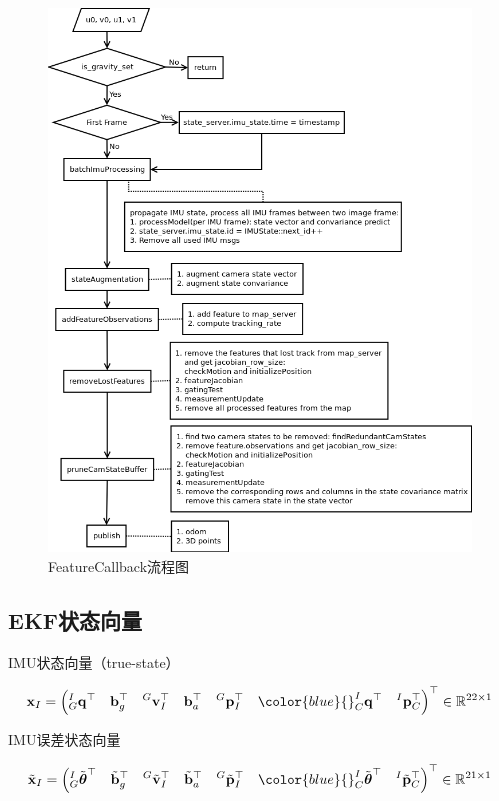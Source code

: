 \documentclass[12pt,a4paper]{article}
\begin{document}
\begin{figure}[!htbp]
\centering
\includegraphics[scale=0.7]{images/feature_cb.png}
\caption{FeatureCallback流程图}
\end{figure}

\newpage
\subsection{EKF状态向量}

IMU状态向量（true-state）

\begin{equation*}
\mathbf{x}_{I} = 
\left(
{}^I_G \mathbf{q}^\top \quad 
\mathbf{b}_g^\top \quad 
{}^G\mathbf{v}^\top_I \quad 
\mathbf{b}_a^\top \quad
{}^G\mathbf{p}^\top_I \quad
{\color{blue}
{}^I_C \mathbf{q}^\top \quad
{}^I\mathbf{p}^\top_C}
\right)^\top
\in \mathbb{R}^{22 \times 1}
\end{equation*}

IMU误差状态向量

\begin{equation*}
\tilde{\mathbf{x}}_{I} = 
\left(
{}^I_G \tilde{\boldsymbol{\theta}}^\top \quad 
\tilde{\mathbf{b}}_g^\top \quad 
{}^G\tilde{\mathbf{v}}^\top_I \quad 
\tilde{\mathbf{b}}_a^\top \quad
{}^G\tilde{\mathbf{p}}^\top_I \quad
{\color{blue}
{}^I_C \tilde{\boldsymbol{\theta}}^\top \quad
{}^I\tilde{\mathbf{p}}^\top_C}
\right)^\top 
\in \mathbb{R}^{21 \times 1}
\end{equation*}
\end{document}
